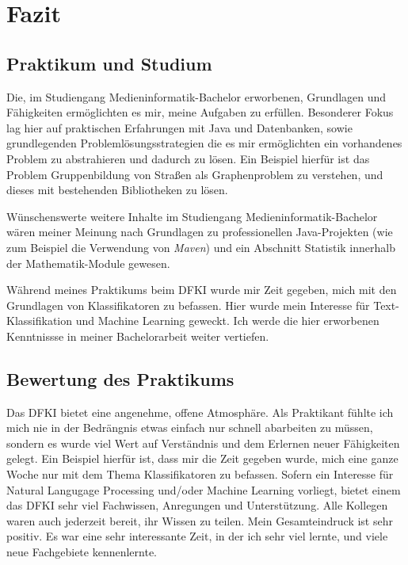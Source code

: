 \chapter{Fazit}
\section{Praktikum und Studium}
Die, im Studiengang Medieninformatik-Bachelor erworbenen, Grundlagen und Fähigkeiten ermöglichten es mir, meine Aufgaben zu erfüllen.
Besonderer Fokus lag hier auf praktischen Erfahrungen mit Java und Datenbanken, sowie grundlegenden Problemlösungsstrategien die es mir ermöglichten ein vorhandenes Problem zu abstrahieren und dadurch zu lösen.
Ein Beispiel hierfür ist das Problem Gruppenbildung von Straßen als Graphenproblem zu verstehen, und dieses mit bestehenden Bibliotheken zu lösen.

Wünschenswerte weitere Inhalte im Studiengang Medieninformatik-Bachelor wären meiner Meinung nach Grundlagen zu professionellen Java-Projekten (wie zum Beispiel die Verwendung von \textit{Maven}) und ein Abschnitt Statistik innerhalb der Mathematik-Module gewesen.

Während meines Praktikums beim DFKI wurde mir Zeit gegeben, mich mit den Grundlagen von Klassifikatoren zu befassen.
Hier wurde mein Interesse für Text-Klassifikation und Machine Learning geweckt.
Ich werde die hier erworbenen Kenntnissse in meiner Bachelorarbeit weiter vertiefen.

\section{Bewertung des Praktikums}

Das DFKI bietet eine angenehme, offene Atmosphäre.
Als Praktikant fühlte ich mich nie in der Bedrängnis etwas einfach nur schnell abarbeiten zu müssen, sondern es wurde viel Wert auf Verständnis und dem Erlernen neuer Fähigkeiten gelegt.
Ein Beispiel hierfür ist, dass mir die Zeit gegeben wurde, mich eine ganze Woche nur mit dem Thema Klassifikatoren zu befassen.
Sofern ein Interesse für Natural Langugage Processing und/oder Machine Learning vorliegt, bietet einem das DFKI sehr viel Fachwissen, Anregungen und Unterstützung.
Alle Kollegen waren auch jederzeit bereit, ihr Wissen zu teilen.
Mein Gesamteindruck ist sehr positiv.
Es war eine sehr interessante Zeit, in der ich sehr viel lernte, und viele neue Fachgebiete kennenlernte.
